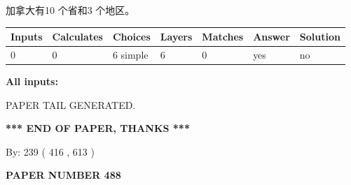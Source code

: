 \documentclass{ctexart}
\begin{document}
 
加拿大有10 个省和3 个地区。
 
 
\noindent{}
 
 
   
   
   
   
\noindent\begin{tabular}{|l|l|l|l|l|l|l|}
 \hline
Inputs & Calculates & Choices & Layers & Matches & Answer & Solution \\ \hline
 0  & 
 0  & 
 6
  simple  
  & 
 6  & 
 0  & 
  yes & 
  no 
  \\ \hline
 \end{tabular}
   
   
   
   
\noindent{}
   
   
   
   
\noindent\vspace{0.1in}\hspace{-0.08in} {\textbf{\Large{All inputs: }}}
   
   
   
   
   
   
 \vspace{0.2in}
 
   
   
\vspace{2.0in} PAPER TAIL GENERATED.
   
   
   
   
\vspace{1.0in} 
{\textbf{\large{ *** END OF PAPER, THANKS *** }}} 
   
   
\hspace{1.0in} By: 
 239 ( 416 ,  613 )
   
   
   
   
\newpage 
\setcounter{page}{ 
   488001 } 
   
   
   
   
 {\textbf{ \Large{ PAPER NUMBER  488  }}}
   
   
\vspace{0.2in}
   
   
   
   
   
   
   
\end{document}
